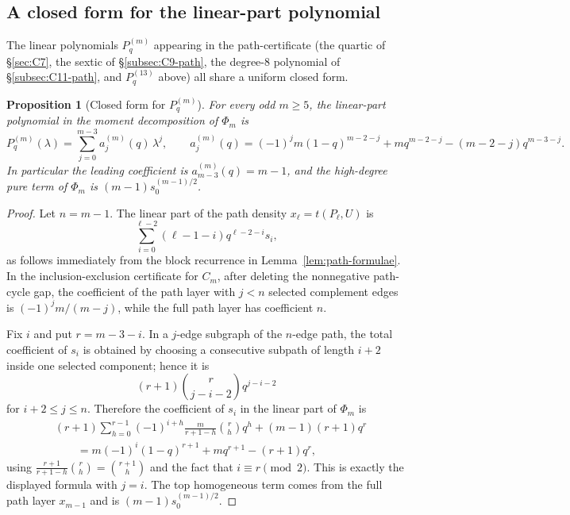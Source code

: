 \documentclass[11pt]{article}
\newtheorem{proposition}[theorem]{Proposition}
\begin{document}
\subsection{A closed form for the linear-part polynomial}

The linear polynomials $P_q^{(m)}$ appearing in the path-certificate (the quartic of \S\ref{sec:C7}, the sextic of \S\ref{subsec:C9-path}, the degree-$8$ polynomial of \S\ref{subsec:C11-path}, and $P_q^{(13)}$ above) all share a uniform closed form.

\begin{proposition}[Closed form for $P_q^{(m)}$]\label{prop:Pq-closed}
For every odd $m\ge5$, the linear-part polynomial in the moment decomposition of $\Phi_m$ is
\[
        P_q^{(m)}(\lambda)=\sum_{j=0}^{m-3}a_j^{(m)}(q)\,\lambda^j,
        \qquad
        a_j^{(m)}(q)=(-1)^j m(1-q)^{m-2-j}+mq^{m-2-j}-(m-2-j)q^{m-3-j}.
\]
In particular the leading coefficient is $a_{m-3}^{(m)}(q)=m-1$, and the high-degree pure term of $\Phi_m$ is $(m-1)s_0^{(m-1)/2}$.
\end{proposition}

\begin{proof}
Let $n=m-1$.  The linear part of the path density $x_\ell=t(P_\ell,U)$ is
\[
        \sum_{i=0}^{\ell-2}(\ell-1-i)q^{\ell-2-i}s_i,
\]
as follows immediately from the block recurrence in Lemma~\ref{lem:path-formulae}.  In the inclusion-exclusion certificate for $C_m$, after deleting the nonnegative path-cycle gap, the coefficient of the path layer with $j<n$ selected complement edges is $(-1)^j m/(m-j)$, while the full path layer has coefficient $n$.

Fix $i$ and put $r=m-3-i$.  In a $j$-edge subgraph of the $n$-edge path, the total coefficient of $s_i$ is obtained by choosing a consecutive subpath of length $i+2$ inside one selected component; hence it is
\[
        (r+1)\binom{r}{j-i-2}q^{j-i-2}
\]
for $i+2\le j\le n$.  Therefore the coefficient of $s_i$ in the linear part of $\Phi_m$ is
\[
\begin{aligned}
&(r+1)\sum_{h=0}^{r-1}(-1)^{i+h} \frac{m}{r+1-h}\binom rh q^h
        +(m-1)(r+1)q^r\\
&\qquad
=m(-1)^i(1-q)^{r+1}+mq^{r+1}-(r+1)q^r,
\end{aligned}
\]
using $\frac{r+1}{r+1-h}\binom rh=\binom{r+1}{h}$ and the fact that $i\equiv r\pmod 2$.  This is exactly the displayed formula with $j=i$.  The top homogeneous term comes from the full path layer $x_{m-1}$ and is $(m-1)s_0^{(m-1)/2}$.
\end{proof}
\end{document}
